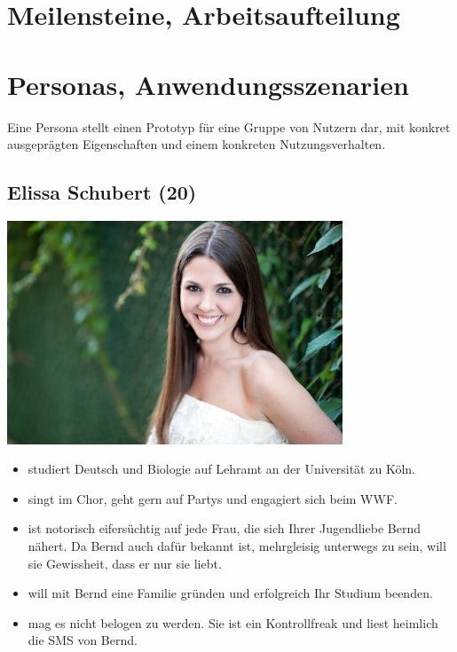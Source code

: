 \documentclass[10pt, a4paper, oneside, titlepage]{scrartcl} %
\begin{document}
	\newpage
 
	\section{Meilensteine, Arbeitsaufteilung}
   
   	\section{Personas, Anwendungsszenarien}
   	Eine Persona stellt einen Prototyp für eine Gruppe von Nutzern dar, mit konkret ausgeprägten Eigenschaften und einem konkreten Nutzungsverhalten.
   	
	\subsection{Elissa Schubert (20)}
	\begin{center}
		\includegraphics[width=10.0cm]{persona_01.jpg}
	\end{center}
	\begin{itemize}
		\item{}studiert Deutsch und Biologie auf Lehramt an der Universität zu Köln.
		\item{}singt im Chor, geht gern auf Partys und engagiert sich beim WWF.
		\item{}ist notorisch eifersüchtig auf jede Frau, die sich Ihrer Jugendliebe Bernd nähert. Da Bernd auch dafür bekannt ist, mehrgleisig unterwegs zu sein, 		will sie Gewissheit, dass er nur sie liebt.
		\item{}will mit Bernd eine Familie gründen und erfolgreich Ihr Studium beenden.
		\item{}mag es nicht belogen zu werden. Sie ist ein Kontrollfreak und liest heimlich die SMS von Bernd.
	\end{itemize}	   
   
\end{document}
